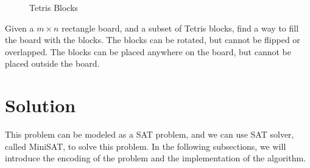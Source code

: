 \documentclass[12pt, a4paper]{article}
\theoremstyle{mystyle}
\begin{document}
\begin{figure}[H]
        \caption{Tetris Blocks}
    \end{figure}

    Given a $m\times n$ rectangle board, and a subset of Tetris blocks, find a way to fill the board with the blocks. The blocks can be rotated, but cannot be flipped or overlapped. The blocks can be placed anywhere on the board, but cannot be placed outside the board.
    \section{Solution}
        This problem can be modeled as a \textsf{SAT} problem, and we can use \textsf{SAT} solver, called \textsf{MiniSAT}, to solve this problem. In the following subsections, we will introduce the encoding of the problem and the implementation of the algorithm.
\end{document}
